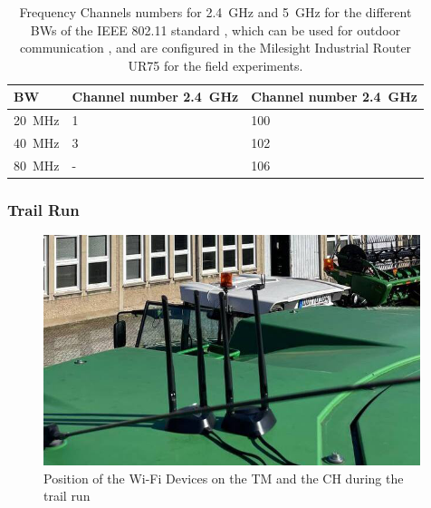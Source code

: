 \begin{table}[H]
	\centering
	\begin{tabular}{>{\centering}p{2cm}p{4cm}p{4cm}}
		\toprule
		\ac{BW} & Channel number \SI{2.4}{\giga\hertz} & Channel number \SI{2.4}{\giga\hertz}\\
		\midrule
		\SI{20}{\mega\hertz} & \num{1}&
		\num{100} \\
		\SI{40}{\mega\hertz} &
		\num{3}
		& \num{102} \\
		\SI{80}{\mega\hertz} &
		- & \num{106} \\
		\bottomrule
	\end{tabular}
	\caption{Frequency Channels numbers for \SI{2.4}{\giga\hertz} and \SI{5}{\giga\hertz} for the different \acf{BW}s of the IEEE 802.11 standard \cite{noauthor_ieee_2021-1}, which can be used for
	outdoor communication \cite{freq_plan_24G}, \cite{freq_plan_5G} and are configured in the Milesight Industrial Router UR75 for
	the field experiments.}
	\label{tab:fieldChannels}
\end{table}


\subsubsection*{Trail Run}

\begin{figure}[H]%
	\centering
	\includegraphics[width=0.98\textwidth]{figures/trainRun}
	\caption{Position of the Wi-Fi Devices on the \ac{TM} and the \ac{CH} during the trail run}
	\label{fig:trailrunPositions}%
\end{figure}

